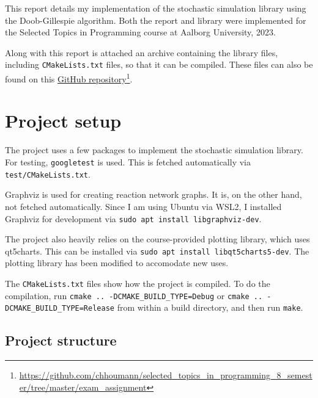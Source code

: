 This report details my implementation of the stochastic simulation library using the Doob-Gillespie algorithm.
Both the report and library were implemented for the Selected Topics in Programming course at Aalborg University, 2023.

Along with this report is attached an archive containing the library files, including \texttt{CMakeLists.txt} files, so that it can be compiled.
These files can also be found on this \href{https://github.com/chhoumann/selected_topics_in_programming_8_semester/tree/master/exam_assignment}{GitHub repository}\footnote{\url{https://github.com/chhoumann/selected_topics_in_programming_8_semester/tree/master/exam_assignment}}.

\section{Project setup}
The project uses a few packages to implement the stochastic simulation library.
For testing, \texttt{googletest} is used. This is fetched automatically via \texttt{test/CMakeLists.txt}.

Graphviz is used for creating reaction network graphs. It is, on the other hand, not fetched automatically.
Since I am using Ubuntu via WSL2, I installed Graphviz for development via \texttt{sudo apt install libgraphviz-dev}.

The project also heavily relies on the course-provided plotting library, which uses qt5charts.
This can be installed via \texttt{sudo apt install libqt5charts5-dev}. The plotting library has been modified to accomodate new uses.

The \texttt{CMakeLists.txt} files show how the project is compiled.
To do the compilation, run \texttt{cmake .. -DCMAKE_BUILD_TYPE=Debug} or \texttt{cmake .. -DCMAKE_BUILD_TYPE=Release} from within a build directory, and then run \texttt{make}.

\subsection{Project structure}

